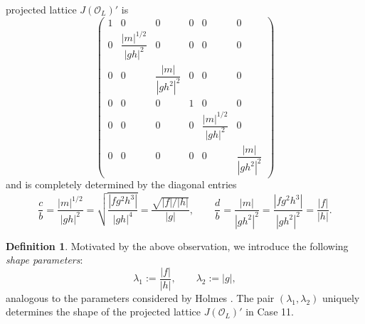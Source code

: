 \documentclass{amsart}
\newcommand{\cO}{\mathcal{O}}
\theoremstyle{plain}
\theoremstyle{definition}
\newtheorem{definition}[theorem]{Definition}
\theoremstyle{remark}
\numberwithin{equation}{section}
\begin{document}
projected lattice $J(\cO_L)'$ is 
\[
\begin{pmatrix}
1 & 0 & 0 & 0 & 0 & 0\\
0 & \dfrac{|m|^{1/2}}{|gh|^{2}} & 0 & 0 & 0 & 0\\
0 & 0 & \dfrac{|m|}{|gh^2|^{2}} & 0 & 0 & 0\\
0 & 0 & 0 & 1 & 0 & 0\\
0 & 0 & 0 & 0 & \dfrac{|m|^{1/2}}{|gh|^{2}} & 0\\
0 & 0 & 0 & 0 & 0 & \dfrac{|m|}{|gh^2|^{2}}
\end{pmatrix}
\]
and is completely determined by the diagonal entries
\[
\frac{c}{b}
=
\frac{|m|^{1/2}}{|gh|^{2}}
=
\sqrt{\frac{|fg^2h^3|}{|gh|^{4}}}
=
\frac{\sqrt{|f|/|h|}}{|g|},
\qquad
\frac{d}{b}
=
\frac{|m|}{|gh^2|^{2}}
=
\frac{|fg^2h^3|}{|gh^2|^{2}}
=
\frac{|f|}{|h|}.
\]
\begin{definition}\label{shape parameter defn}Motivated by the above observation, we introduce the following
\emph{shape parameters}:
\[
\lambda_1 := \frac{|f|}{|h|},
\qquad
\lambda_2 := |g|,
\]
analogous to the parameters considered by Holmes \cite[Section 4.2.1]{Holmes}.
The pair $(\lambda_1,\lambda_2)$ uniquely determines the shape of the
projected lattice $J(\cO_L)'$ in Case 11.
\end{definition}
\end{document}
